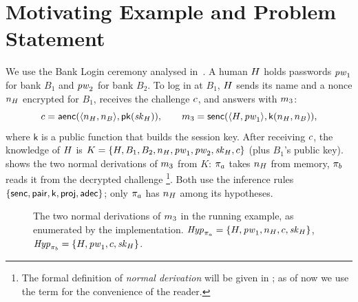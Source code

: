 \section{Motivating Example and Problem Statement}
\label{sec:example}

We use the Bank Login ceremony analysed in~\SCP. A human $H$ holds passwords $\mathit{pw}_1$ for bank $B_1$ and $\mathit{pw}_2$ for bank $B_2$. To log in at $B_1$, $H$ sends its name and a nonce $n_H$ encrypted for $B_1$, receives the challenge $c$, and answers with $m_3$:
\[
  c = \mathsf{aenc}(\langle n_H,n_B\rangle,\mathsf{pk}(\mathit{sk}_H)),\qquad
  m_3 = \mathsf{senc}(\langle H,\mathit{pw}_1\rangle,\mathsf{k}(n_H,n_B)),
\]
where $\mathsf{k}$ is a public function that builds the session key. After receiving $c$, the knowledge of $H$ is $K=\{H,B_1,B_2,n_H,\mathit{pw}_1,\mathit{pw}_2,\mathit{sk}_H,c\}$ (plus $B_1$'s public key).  shows the two normal derivations of $m_3$ from $K$: $\pi_a$ takes $n_H$ from memory, $\pi_b$ reads it from the decrypted challenge \footnote{The formal definition of \textit{normal derivation} will be given in ; as of now we use the term for the convenience of the reader.}. Both use the inference rules $\{\mathsf{senc},\mathsf{pair},\mathsf{k},\mathsf{proj},\mathsf{adec}\}$; only $\pi_a$ has $n_H$ among its hypotheses.

\begin{figure}[t]
\centering\small
{}
\caption{The two normal derivations of $m_3$ in the running example, as enumerated by the implementation. $\mathit{Hyp}_{\pi_a}=\{H,\mathit{pw}_1,n_H,c,\mathit{sk}_H\}$, $\mathit{Hyp}_{\pi_b}=\{H,\mathit{pw}_1,c,\mathit{sk}_H\}$.}
\label{fig:derivations}
\end{figure}


